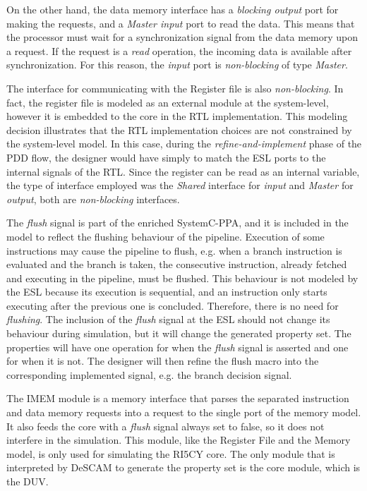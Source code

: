 On the other hand, the data memory interface has a \textit{blocking output} port for making the requests, and a \textit{Master input} port to read the data. This means that the processor must wait for a synchronization signal from the data memory upon a request. If the request is a \textit{read} operation, the incoming data is available after synchronization. For this reason, the \textit{input} port is \textit{non-blocking} of type \textit{Master}.

The interface for communicating with the Register file is also \textit{non-blocking}. In fact, the register file is modeled as an external module at the system-level, however it is embedded to the core in the RTL implementation. This modeling decision illustrates that the RTL implementation choices are not constrained by the system-level model. In this case, during the \textit{refine-and-implement} phase of the PDD flow, the designer would have simply to match the ESL ports to the internal signals of the RTL. Since the register can be read as an internal variable, the type of interface employed was the \textit{Shared} interface for \textit{input} and \textit{Master} for \textit{output}, both are \textit{non-blocking} interfaces.

The \textit{flush} signal is part of the enriched SystemC-PPA, and it is included in the model to reflect the flushing behaviour of the pipeline. Execution of some instructions may cause the pipeline to flush, e.g. when a branch instruction is evaluated and the branch is taken, the consecutive instruction, already fetched and executing in the pipeline, must be flushed. This behaviour is not modeled by the ESL because its execution is sequential, and an instruction only starts executing after the previous one is concluded. Therefore, there is no need for \textit{flushing}. The inclusion of the \textit{flush} signal at the ESL should not change its behaviour during simulation, but it will change the generated property set. The properties will have one operation for when the \textit{flush} signal is asserted and one for when it is not. The designer will then refine the flush macro into the corresponding implemented signal, e.g. the branch decision signal. 

The IMEM module is a memory interface that parses the separated instruction and data memory requests into a request to the single port of the memory model. It also feeds the core with a \textit{flush} signal always set to false, so it does not interfere in the simulation. This module, like the Register File and the Memory model, is only used for simulating the RI5CY core. The only module that is interpreted by DeSCAM to generate the property set is the core module, which is the DUV.

